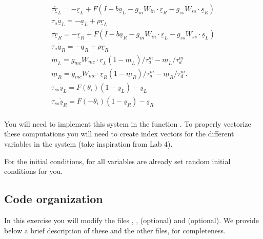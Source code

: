 \documentclass{cmc}
\begin{document}
\begin{equation}
    \begin{array}{lcl}
	\tau \dot{\underline{r}}_{L} = -\underline{r}_L + F(I-b \underline{a}_L - g_{in} W_{in} \cdot \underline{r}_R - g_{ss} W_{ss} \cdot \underline{s}_R )\\
	\tau_a \dot{\underline{a}}_L = -\underline{a}_L + \rho \underline{r}_L \\
	\tau \dot{\underline{r}}_{R} = -\underline{r}_R + F(I-b \underline{a}_R - g_{in} W_{in} \cdot \underline{r}_L - g_{ss} W_{ss} \cdot \underline{s}_L )\\
	\tau_a \dot{\underline{a}}_R = -\underline{a}_R + \rho \underline{r}_R \\
	\dot{\underline{m}}_L = g_{mc} W_{mc} \cdot \underline{r}_L (1-\underline{m}_L) / \tau^m_a - \underline{m}_L/ \tau^m_d\\
	\dot{\underline{m}}_R = g_{mc} W_{mc} \cdot \underline{r}_R (1-\underline{m}_R) / \tau^m_a - \underline{m}_R/ \tau^m_d. \\
	\tau_{ss} \dot{\underline{s}}_L = F(\theta_i) (1-\underline{s}_L) - \underline{s}_L\\
	\tau_{ss} \dot{\underline{s}}_R = F(-\theta_i) (1-\underline{s}_R) - \underline{s}_R\\
    \end{array}
	\label{eq:equations_vectorial}
\end{equation}

You will need to implement this system in the function . To properly vectorize these computations you will need to create index vectors for the different variables in the system (take inspiration from Lab 4).

For the initial conditions, for all variables are already set random initial conditions for you.


\subsection*{Code organization}\label{subsec:code}

In this exercise you will modify the files , ,  (optional) and  (optional). We provide below
a brief description of these and the other files, for completeness.
\end{document}
